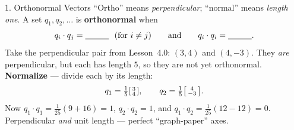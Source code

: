\documentclass[10pt]{article}
\begin{document}
\begin{notesbox}{1. Orthonormal Vectors}
``Ortho'' means \emph{perpendicular}; ``normal'' means \emph{length one}. A set $q_1,q_2,\dots$ is
\textbf{orthonormal} when
\[
  q_i\cdot q_j=\blank{1.0cm}\ \ (\text{for } i\ne j)\qquad\text{and}\qquad q_i\cdot q_i=\blank{1.0cm}.
\]
Take the perpendicular pair from Lesson~4.0: $(3,4)$ and $(4,-3)$. They \emph{are} perpendicular, but each
has length $5$, so they are not yet orthonormal. \textbf{Normalize} --- divide each by its length:
\[
  q_1=\tfrac15\begin{bsmallmatrix} 3\\ 4 \end{bsmallmatrix},\qquad
  q_2=\tfrac15\begin{bsmallmatrix} 4\\ -3 \end{bsmallmatrix}.
\]
Now $q_1\cdot q_1=\tfrac{1}{25}(9{+}16)=1$, $q_2\cdot q_2=1$, and $q_1\cdot q_2=\tfrac{1}{25}(12{-}12)=0$.
Perpendicular \emph{and} unit length --- perfect ``graph-paper'' axes.

\begin{center}
\end{center}
\end{notesbox}
\end{document}
